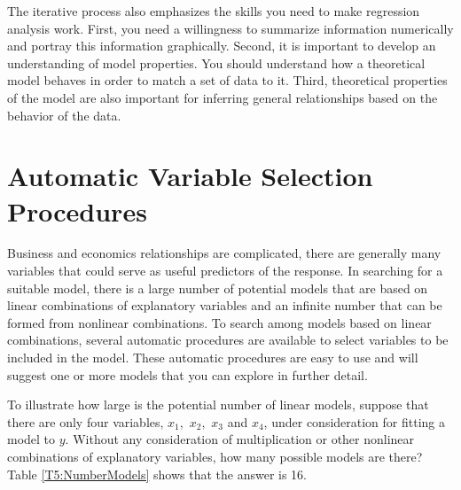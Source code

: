 The iterative process also emphasizes the skills you need to make
regression analysis work. First, you need a willingness to summarize
information numerically and portray this information graphically.
Second, it is important to develop an understanding of model
properties. You should understand how a theoretical model behaves in
order to match a set of data to it. Third, theoretical properties of
the model are also important for inferring general relationships
based on the behavior of the data.


\section{Automatic Variable Selection
Procedures}\label{S5:Automatic}

Business and economics relationships are complicated, there are
generally many variables that could serve as useful predictors of
the response. In searching for a suitable model, there is a large
number of potential models that are based on linear combinations of
explanatory variables and an infinite number that can be formed from
nonlinear combinations. To search among models based on linear
combinations, several automatic procedures are available to select
variables to be included in the model. These automatic procedures
are easy to use and will suggest one or more models that you can
explore in further detail.

To illustrate how large is the potential number of linear models,
suppose that there are only four variables, $x_{1},$ $x_2,$ $x_3$
and $x_4$, under consideration for fitting a model to $y$. Without
any consideration of multiplication or other nonlinear combinations
of explanatory variables, how many possible models are there? Table
\ref{T5:NumberModels} shows that the answer is 16.

